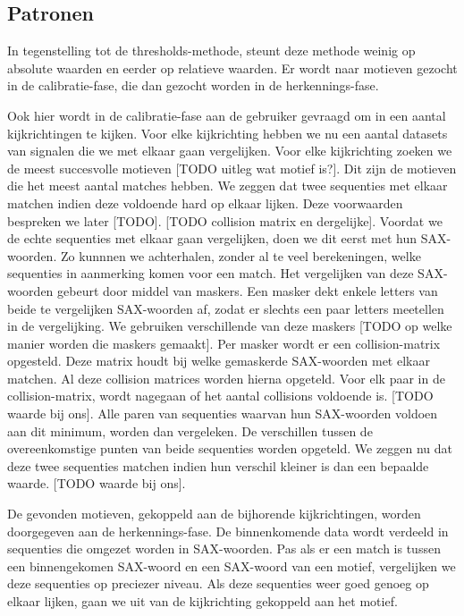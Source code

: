\documentclass{article}
\begin{document}
\subsection{Patronen}

In tegenstelling tot de thresholds-methode, steunt deze methode weinig op absolute waarden en eerder op relatieve waarden. Er wordt naar motieven gezocht in de calibratie-fase, die dan gezocht worden in de herkennings-fase. \cite{motifs}

Ook hier wordt in de calibratie-fase aan de gebruiker gevraagd om in een aantal kijkrichtingen te kijken. Voor elke kijkrichting hebben we nu een aantal datasets van signalen die we met elkaar gaan vergelijken. Voor elke kijkrichting zoeken we de meest succesvolle motieven [TODO uitleg wat motief is?]. Dit zijn de motieven die het meest aantal matches hebben. We zeggen dat twee sequenties met elkaar matchen indien deze voldoende hard op elkaar lijken. Deze voorwaarden bespreken we later [TODO]. [TODO collision matrix en dergelijke]. Voordat we de echte sequenties met elkaar gaan vergelijken, doen we dit eerst met hun SAX-woorden. Zo kunnnen we achterhalen, zonder al te veel berekeningen, welke sequenties in aanmerking komen voor een match. Het vergelijken van deze SAX-woorden gebeurt door middel van maskers. Een masker dekt enkele letters van beide te vergelijken SAX-woorden af, zodat er slechts een paar letters meetellen in de vergelijking. We gebruiken verschillende van deze maskers [TODO op welke manier worden die maskers gemaakt]. Per masker wordt er een collision-matrix opgesteld. Deze matrix houdt bij welke gemaskerde SAX-woorden met elkaar matchen. Al deze collision matrices worden hierna opgeteld. Voor elk paar in de collision-matrix, wordt nagegaan of het aantal collisions voldoende is. [TODO waarde bij ons]. Alle paren van sequenties waarvan hun SAX-woorden voldoen aan dit minimum, worden dan vergeleken. De verschillen tussen de overeenkomstige punten van beide sequenties worden opgeteld. We zeggen nu dat deze twee sequenties matchen indien hun verschil kleiner is dan een bepaalde waarde. [TODO waarde bij ons].

De gevonden motieven, gekoppeld aan de bijhorende kijkrichtingen, worden doorgegeven aan de herkennings-fase. De binnenkomende data wordt verdeeld in sequenties die omgezet worden in SAX-woorden. Pas als er een match is tussen een binnengekomen SAX-woord en een SAX-woord van een motief, vergelijken we deze sequenties op preciezer niveau. Als deze sequenties weer goed genoeg op elkaar lijken, gaan we uit van de kijkrichting gekoppeld aan het motief.
\end{document}
